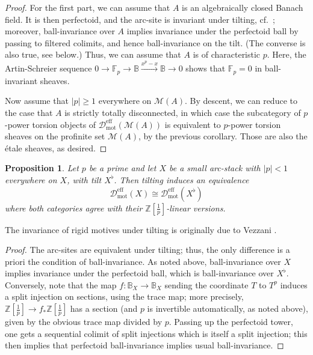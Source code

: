 \documentclass[11pt]{amsart}
\numberwithin{equation}{section}
\numberwithin{theorem}{section}
\newtheorem{proposition}[theorem]{Proposition}
\theoremstyle{definition}
\begin{document}
\begin{proof} For the first part, we can assume that $A$ is an algebraically closed Banach field. It is then perfectoid, and the arc-site is invariant under tilting, cf.~\cite[Theorem 3.12, 3.13]{ECoD}; moreover, ball-invariance over $A$ implies invariance under the perfectoid ball by passing to filtered colimits, and hence ball-invariance on the tilt. (The converse is also true, see below.) Thus, we can assume that $A$ is of characteristic $p$. Here, the Artin-Schreier sequence $0\to \mathbb F_p\to \mathbb B\xrightarrow{x^p-x} \mathbb B\to 0$ shows that $\mathbb F_p=0$ in ball-invariant sheaves.

Now assume that $|p|\geq 1$ everywhere on $\mathcal M(A)$. By descent, we can reduce to the case that $A$ is strictly totally disconnected, in which case the subcategory of $p$-power torsion objects of $\mathcal D_{\mathrm{mot}}^{\mathrm{eff}}(\mathcal M(A))$ is equivalent to $p$-power torsion sheaves on the profinite set $\mathcal M(A)$, by the previous corollary. Those are also the \'etale sheaves, as desired.
\end{proof}

\begin{proposition}\label{prop:effectivetilting} Let $p$ be a prime and let $X$ be a small arc-stack with $|p|<1$ everywhere on $X$, with tilt $X^\flat$. Then tilting induces an equivalence
\[
\mathcal D_{\mathrm{mot}}^{\mathrm{eff}}(X)\cong \mathcal D_{\mathrm{mot}}^{\mathrm{eff}}(X^\flat)
\]
where both categories agree with their $\mathbb Z[\tfrac 1p]$-linear versions.
\end{proposition}

The invariance of rigid motives under tilting is originally due to Vezzani \cite{Vezzani}.

\begin{proof} The arc-sites are equivalent under tilting; thus, the only difference is a priori the condition of ball-invariance. As noted above, ball-invariance over $X$ implies invariance under the perfectoid ball, which is ball-invariance over $X^\flat$. Conversely, note that the map $f: \mathbb B_X\to \mathbb B_X$ sending the coordinate $T$ to $T^p$ induces a split injection on sections, using the trace map; more precisely, $\mathbb Z[\tfrac 1p]\to f_\ast \mathbb Z[\tfrac 1p]$ has a section (and $p$ is invertible automatically, as noted above), given by the obvious trace map divided by $p$. Passing up the perfectoid tower, one gets a sequential colimit of split injections which is itself a split injection; this then implies that perfectoid ball-invariance implies usual ball-invariance.
\end{proof}
\end{document}
